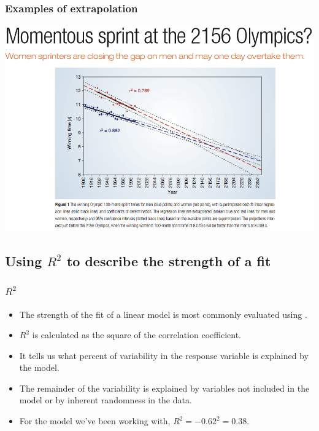 \begin{frame}
\frametitle{Examples of extrapolation}

\begin{center}
\includegraphics[width=\textwidth]{8-2_least_square_reg/figures/womenOutsprint}
\end{center}

\end{frame}


\subsection{Using $R^2$ to describe the strength of a fit}


\begin{frame}
\frametitle{$R^2$}

\begin{itemize}

\item The strength of the fit of a linear model is most commonly evaluated using .

\pause

\item $R^2$ is calculated as the square of the correlation coefficient.

\pause

\item It tells us what percent of variability in the response variable is explained by the model.

\pause

\item The remainder of the variability is explained by variables not included in the model or by inherent randomness in the data.

\pause

\item For the model we've been working with, $R^2 = -0.62^2 = 0.38$.

\end{itemize}

\end{frame}

